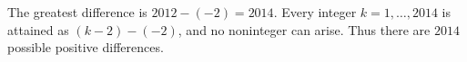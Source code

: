 The greatest difference is $2012-(-2)=2014$. Every integer $k=1,\ldots,2014$ is attained as $(k-2)-(-2)$, and no noninteger can arise. Thus there are $\boxed{2014}$ possible positive differences.
